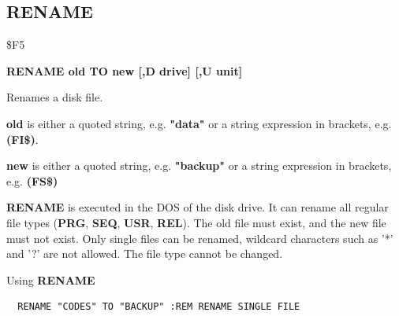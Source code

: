 \subsection{RENAME}
\begin{description}[leftmargin=2cm,style=nextline]
\item [Token:] \$F5
\item [Format:] {\bf RENAME old TO new [,D drive] [,U unit] }
\item [Usage:] Renames a disk file.

   {\bf old} is either a quoted string, e.g. {\bf "data"} or
   a string expression in brackets, e.g. {\bf (FI\$)}.

   {\bf new} is either a quoted string, e.g. {\bf "backup"} or
   a string expression in brackets, e.g. {\bf (FS\$)}

   \drivedefinition

   \unitdefinition

\item [Remarks:]
   {\bf RENAME} is executed in the DOS of the disk drive.
   It can rename all regular file types ({\bf PRG}, {\bf SEQ}, {\bf USR}, {\bf REL}).
   The old file must exist, and the new file must not exist.
   Only single files can be renamed, wildcard characters such as
   '*' and '?' are not allowed. The file type cannot be changed.

\item [Example:] Using {\bf RENAME}
\begin{tcolorbox}[colback=black,coltext=white]
\verbatimfont{\codefont}
\begin{verbatim}
  RENAME "CODES" TO "BACKUP" :REM RENAME SINGLE FILE
\end{verbatim}
\end{tcolorbox}
\end{description}


\newpage

